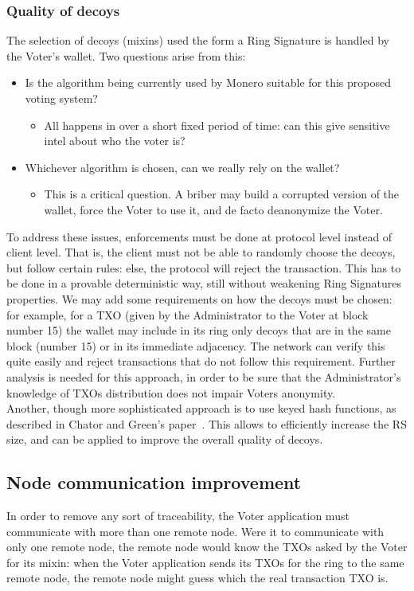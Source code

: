 \documentclass[10pt, letterpaper]{article}
\begin{document}
\subsubsection{Quality of decoys}
The selection of decoys (mixins) used the form a Ring Signature is handled by the Voter’s wallet. Two questions arise from this:
\begin{itemize}
\item Is the algorithm being currently used by Monero suitable for this proposed voting system?
\begin{itemize}
\item All happens in over a short fixed period of time: can this give sensitive intel about who the voter is?
\end{itemize}
\item Whichever algorithm is chosen, can we really rely on the wallet? 
\begin{itemize}
\item This is a critical question. A briber may build a corrupted version of the wallet, force the Voter to use it, and de facto deanonymize the Voter.
\end{itemize}
\end{itemize}

To address these issues, enforcements must be done at protocol level instead of client level. That is, the client must not be able to randomly choose the decoys, but follow certain rules: else, the protocol will reject the transaction. This has to be done in a provable deterministic way, still without weakening Ring Signatures properties. We may add some requirements on how the decoys must be chosen: for example, for a TXO (given by the Administrator to the Voter at block number 15) the wallet may include in its ring only decoys that are in the same block (number 15) or in its immediate adjacency. The network can verify this quite easily and reject transactions that do not follow this requirement. Further analysis is needed for this approach, in order to be sure that the Administrator’s knowledge of TXOs distribution does not impair Voters anonymity.\\
Another, though more sophisticated approach is to use keyed hash functions, as described in Chator and Green’s paper~\cite{8406559}. This allows to efficiently increase the RS size, and can be applied to improve the overall quality of decoys.

\subsection{Node communication improvement}
In order to remove any sort of traceability, the Voter application must communicate with more than one remote node. Were it to communicate with only one remote node, the remote node would know the TXOs asked by the Voter for its mixin: when the Voter application sends its TXOs for the ring to the same remote node, the remote node might guess which the real transaction TXO is. 
\bigskip
\end{document}
